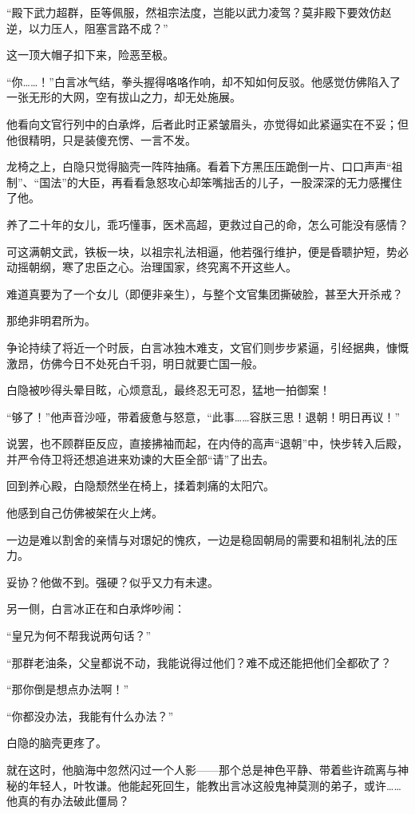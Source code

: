 “殿下武力超群，臣等佩服，然祖宗法度，岂能以武力凌驾？莫非殿下要效仿赵逆，以力压人，阻塞言路不成？”

这一顶大帽子扣下来，险恶至极。

“你……！”白言冰气结，拳头握得咯咯作响，却不知如何反驳。他感觉仿佛陷入了一张无形的大网，空有拔山之力，却无处施展。

他看向文官行列中的白承烨，后者此时正紧皱眉头，亦觉得如此紧逼实在不妥；但他很精明，只是装傻充愣、一言不发。

龙椅之上，白隐只觉得脑壳一阵阵抽痛。看着下方黑压压跪倒一片、口口声声“祖制”、“国法”的大臣，再看看急怒攻心却笨嘴拙舌的儿子，一股深深的无力感攫住了他。

养了二十年的女儿，乖巧懂事，医术高超，更救过自己的命，怎么可能没有感情？

可这满朝文武，铁板一块，以祖宗礼法相逼，他若强行维护，便是昏聩护短，势必动摇朝纲，寒了忠臣之心。治理国家，终究离不开这些人。

难道真要为了一个女儿（即便非亲生），与整个文官集团撕破脸，甚至大开杀戒？

那绝非明君所为。

争论持续了将近一个时辰，白言冰独木难支，文官们则步步紧逼，引经据典，慷慨激昂，仿佛今日不处死白千羽，明日就要亡国一般。

白隐被吵得头晕目眩，心烦意乱，最终忍无可忍，猛地一拍御案！

“够了！”他声音沙哑，带着疲惫与怒意，“此事……容朕三思！退朝！明日再议！”

说罢，也不顾群臣反应，直接拂袖而起，在内侍的高声“退朝”中，快步转入后殿，并严令侍卫将还想追进来劝谏的大臣全部“请”了出去。

回到养心殿，白隐颓然坐在椅上，揉着刺痛的太阳穴。

他感到自己仿佛被架在火上烤。

一边是难以割舍的亲情与对璟妃的愧疚，一边是稳固朝局的需要和祖制礼法的压力。

妥协？他做不到。强硬？似乎又力有未逮。

另一侧，白言冰正在和白承烨吵闹：

“皇兄为何不帮我说两句话？”

“那群老油条，父皇都说不动，我能说得过他们？难不成还能把他们全都砍了？

“那你倒是想点办法啊！”

“你都没办法，我能有什么办法？”

白隐的脑壳更疼了。

就在这时，他脑海中忽然闪过一个人影——那个总是神色平静、带着些许疏离与神秘的年轻人，叶牧谦。他能起死回生，能教出言冰这般鬼神莫测的弟子，或许……他真的有办法破此僵局？

